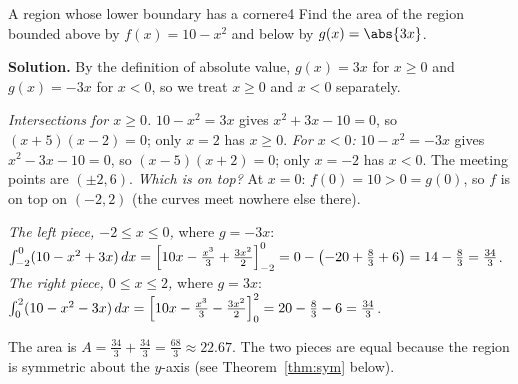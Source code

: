 \documentclass[11pt]{article}
\begin{document}
\begin{exmp}{A region whose lower boundary has a corner}{e4}
Find the area of the region bounded above by $f(x)=10-x^2$ and below by $g(x)=\abs{3x}$.

\textbf{Solution.} By the definition of absolute value, $g(x)=3x$ for $x\ge0$ and $g(x)=-3x$ for $x<0$, so we treat $x\ge0$ and $x<0$ separately.

\emph{Intersections for $x\ge0$.} $10-x^2=3x$ gives $x^2+3x-10=0$, so $(x+5)(x-2)=0$; only $x=2$ has $x\ge0$. \emph{For $x<0$:} $10-x^2=-3x$ gives $x^2-3x-10=0$, so $(x-5)(x+2)=0$; only $x=-2$ has $x<0$. The meeting points are $(\pm2,6)$.
\emph{Which is on top?} At $x=0$: $f(0)=10>0=g(0)$, so $f$ is on top on $(-2,2)$ (the curves meet nowhere else there).

\emph{The left piece, $-2\le x\le0$,} where $g=-3x$: $\int_{-2}^0(10-x^2+3x)\,dx=\Bigl[10x-\frac{x^3}3+\frac{3x^2}2\Bigr]_{-2}^0=0-\left(-20+\frac83+6\right)=14-\frac83=\frac{34}3$.
\emph{The right piece, $0\le x\le2$,} where $g=3x$: $\int_0^2(10-x^2-3x)\,dx=\Bigl[10x-\frac{x^3}3-\frac{3x^2}2\Bigr]_0^2=20-\frac83-6=\frac{34}3$.

The area is $A=\frac{34}3+\frac{34}3=\frac{68}3\approx22.67$. The two pieces are equal because the region is symmetric about the $y$-axis (see Theorem~\ref{thm:sym} below).


\end{exmp}
\end{document}
